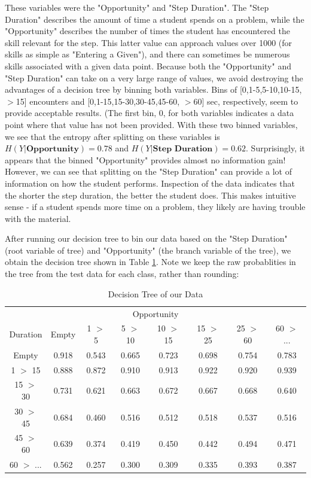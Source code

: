 \documentclass{article} %
\begin{document}
These variables were the "Opportunity" and "Step Duration". The "Step Duration" describes the amount of time a student spends on a problem, while the "Opportunity" describes the number of times the student has encountered the skill relevant for the step. This latter value can approach values over 1000 (for skills as simple as "Entering a Given"), and there can sometimes be numerous skills associated with a given data point. Because both the "Opportunity" and "Step Duration" can take on a very large range of values, we avoid destroying the advantages of a decision tree by binning both variables. Bins of [0,1-5,5-10,10-15,$>$15] encounters and [0,1-15,15-30,30-45,45-60, $>$60] sec, respectively, seem to provide acceptable results. (The first bin, 0, for both variables indicates a data point where that value has not been provided. With these two binned variables, we see that the entropy after splitting on these variables is $H(Y|\textbf{Opportunity}) = 0.78$ and $H(Y|\textbf{Step Duration}) = 0.62$. Surprisingly, it appears that the binned "Opportunity" provides almost no information gain! However, we can see that splitting on the "Step Duration" can provide a lot of information on how the student performs. Inspection of the data indicates that the shorter the step duration, the better the student does. This makes intuitive sense - if a student spends more time on a problem, they likely are having trouble with the material.

After running our decision tree to bin our data based on the "Step Duration" (root variable of tree) and "Opportunity" (the branch variable of the tree), we obtain the decision tree shown in Table \ref{dtree}. Note we keep the raw probablities in the tree from the test data for each class, rather than rounding:


\begin{table}[t]
\begin{center}
\begin{tabular}{c|c|c|c|c|c|c|c}
\multicolumn{8}{c}{Opportunity}\\
Duration & Empty & 1 $>$ 5 & 5 $>$ 10 & 10 $>$ 15 & 15 $>$ 25 & 25 $>$ 60 & 60 $>$ ...\\
\hline
Empty & 0.918 & 0.543 & 0.665 & 0.723 & 0.698 & 0.754 & 0.783\\
1 $>$ 15 & 0.888 & 0.872 & 0.910 & 0.913 & 0.922 & 0.920 & 0.939\\
15 $>$ 30 & 0.731 & 0.621 & 0.663 & 0.672 & 0.667 & 0.668 & 0.640\\
30 $>$ 45 & 0.684 & 0.460 & 0.516 & 0.512 & 0.518 & 0.537 & 0.516\\
45 $>$ 60 & 0.639 & 0.374 & 0.419 & 0.450 & 0.442 & 0.494 & 0.471\\
60 $>$ ... & 0.562 & 0.257 & 0.300 & 0.309 & 0.335 & 0.393 & 0.387\\
\end{tabular}
\end{center}
\caption{Decision Tree of our Data}\label{dtree}
\end{table}
\end{document}
